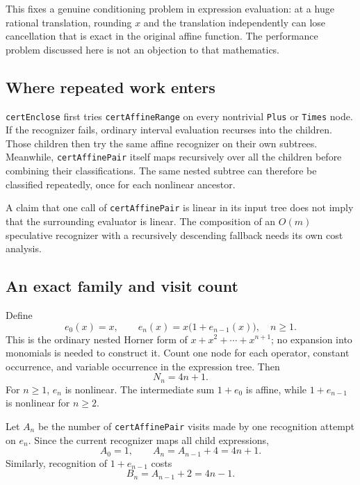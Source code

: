 \documentclass[11pt,letterpaper]{article}
\newcommand{\prop}[1]{\texttt{#1}}
\begin{document}
This fixes a genuine conditioning problem in expression evaluation: at a huge
rational translation, rounding $x$ and the translation independently can lose
cancellation that is exact in the original affine function. The performance
problem discussed here is not an objection to that mathematics.

\subsection{Where repeated work enters}

\prop{certEnclose} first tries \prop{certAffineRange} on every nontrivial
\prop{Plus} or \prop{Times} node. If the recognizer fails, ordinary interval
evaluation recurses into the children. Those children then try the same affine
recognizer on their own subtrees. Meanwhile, \prop{certAffinePair} itself maps
recursively over all the children before combining their classifications.
The same nested subtree can therefore be classified repeatedly, once for each
nonlinear ancestor.\cite{certificates}

A claim that one call of \prop{certAffinePair} is linear in its input tree does
not imply that the surrounding evaluator is linear. The composition of an
$O(m)$ speculative recognizer with a recursively descending fallback needs its
own cost analysis.

\subsection{An exact family and visit count}

Define
\[
 e_0(x)=x,\qquad e_n(x)=x\bigl(1+e_{n-1}(x)\bigr),\quad n\ge1.
\]
This is the ordinary nested Horner form of $x+x^2+\cdots+x^{n+1}$; no expansion
into monomials is needed to construct it. Count one node for each operator,
constant occurrence, and variable occurrence in the expression tree. Then
\[
 N_n=4n+1.
\]
For $n\ge1$, $e_n$ is nonlinear. The intermediate sum $1+e_0$ is affine, while
$1+e_{n-1}$ is nonlinear for $n\ge2$.

Let $A_n$ be the number of \prop{certAffinePair} visits made by one recognition
attempt on $e_n$. Since the current recognizer maps all child expressions,
\[
 A_0=1,\qquad A_n=A_{n-1}+4=4n+1.
\]
Similarly, recognition of $1+e_{n-1}$ costs
\[
 B_n=A_{n-1}+2=4n-1.
\]
\end{document}
